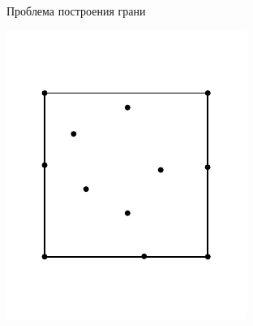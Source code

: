\documentclass[]{beamer} %
\begin{document}
\begin{frame}{Проблема построения грани}
\begin{minipage}{.1\textwidth}
      \end{minipage}
      \begin{minipage}{.3\textwidth}
        \centering
        \includegraphics[width=\linewidth]{affine1.pdf}
      \end{minipage}


\end{frame}
\end{document}

